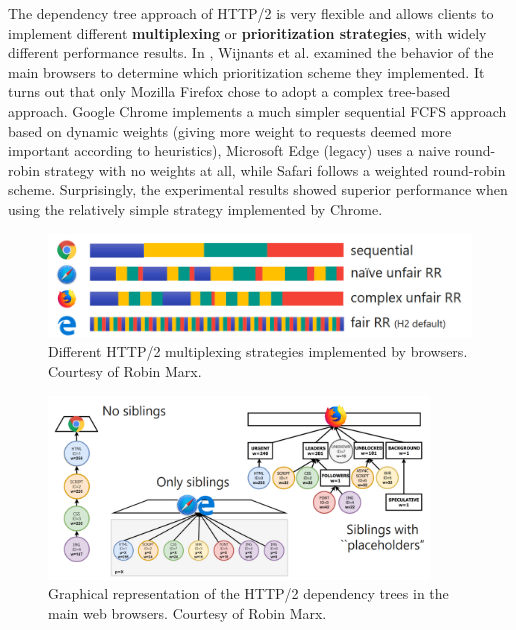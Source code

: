 The dependency tree approach of HTTP/2 is very flexible and allows clients to implement different \textbf{multiplexing} or \textbf{prioritization strategies}, with widely different performance results. In \cite{http2pri}, Wijnants et al. examined the behavior of the main browsers to determine which prioritization scheme they implemented. It turns out that only Mozilla Firefox chose to adopt a complex tree-based approach. Google Chrome implements a much simpler sequential FCFS approach based on dynamic weights (giving more weight to requests deemed more important according to heuristics), Microsoft Edge (legacy) uses a naive round-robin strategy with no weights at all, while Safari follows a weighted round-robin scheme. Surprisingly, the experimental results showed superior performance when using the relatively simple strategy implemented by Chrome.

\begin{figure}[h]
    \centering
    \includegraphics[width=\textwidth]{res/marx_h2pri_browsers.png}
    \caption{Different HTTP/2 multiplexing strategies implemented by browsers. Courtesy of Robin Marx.\protect\footnotemark}
    \label{fig:marx1}
\end{figure}


\begin{figure}
    \centering
    \includegraphics[width=0.9\textwidth]{res/marx_h2pri_tree.png}
    \caption{Graphical representation of the HTTP/2 dependency trees in the main web browsers. Courtesy of Robin Marx.}
    \label{fig:marx2}
\end{figure}

